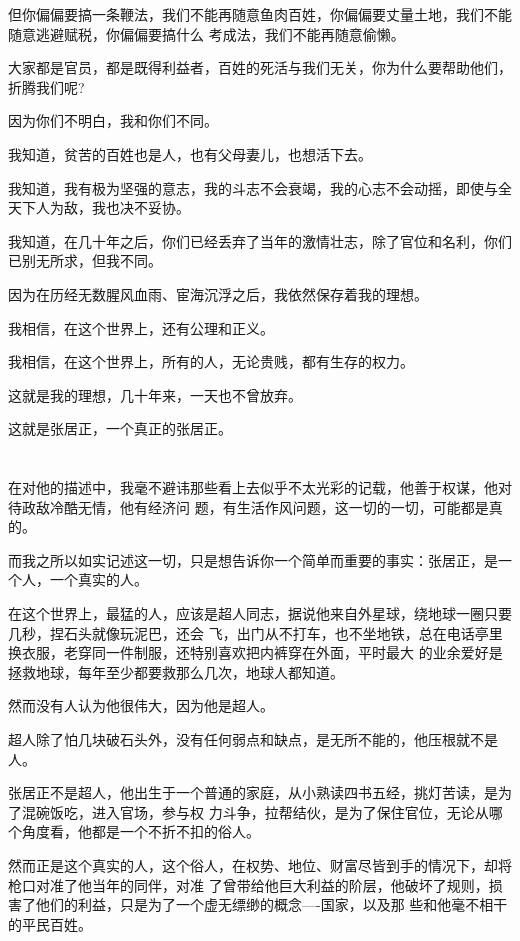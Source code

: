 \documentclass[11pt,a4paper,onecolumn]{article}
\begin{document}
但你偏偏要搞一条鞭法，我们不能再随意鱼肉百姓，你偏偏要丈量土地，我们不能随意逃避赋税，你偏偏要搞什么
考成法，我们不能再随意偷懒。

大家都是官员，都是既得利益者，百姓的死活与我们无关，你为什么要帮助他们，折腾我们呢?

因为你们不明白，我和你们不同。

我知道，贫苦的百姓也是人，也有父母妻儿，也想活下去。

我知道，我有极为坚强的意志，我的斗志不会衰竭，我的心志不会动摇，即使与全天下人为敌，我也决不妥协。

我知道，在几十年之后，你们已经丢弃了当年的激情壮志，除了官位和名利，你们已别无所求，但我不同。

因为在历经无数腥风血雨、宦海沉浮之后，我依然保存着我的理想。

我相信，在这个世界上，还有公理和正义。

我相信，在这个世界上，所有的人，无论贵贱，都有生存的权力。

这就是我的理想，几十年来，一天也不曾放弃。

这就是张居正，一个真正的张居正。

\section[\thesection]{}

在对他的描述中，我毫不避讳那些看上去似乎不太光彩的记载，他善于权谋，他对待政敌冷酷无情，他有经济问
题，有生活作风问题，这一切的一切，可能都是真的。

而我之所以如实记述这一切，只是想告诉你一个简单而重要的事实：张居正，是一个人，一个真实的人。

在这个世界上，最猛的人，应该是超人同志，据说他来自外星球，绕地球一圈只要几秒，捏石头就像玩泥巴，还会
飞，出门从不打车，也不坐地铁，总在电话亭里换衣服，老穿同一件制服，还特别喜欢把内裤穿在外面，平时最大
的业余爱好是拯救地球，每年至少都要救那么几次，地球人都知道。

然而没有人认为他很伟大，因为他是超人。

超人除了怕几块破石头外，没有任何弱点和缺点，是无所不能的，他压根就不是人。

张居正不是超人，他出生于一个普通的家庭，从小熟读四书五经，挑灯苦读，是为了混碗饭吃，进入官场，参与权
力斗争，拉帮结伙，是为了保住官位，无论从哪个角度看，他都是一个不折不扣的俗人。

然而正是这个真实的人，这个俗人，在权势、地位、财富尽皆到手的情况下，却将枪口对准了他当年的同伴，对准
了曾带给他巨大利益的阶层，他破坏了规则，损害了他们的利益，只是为了一个虚无缥缈的概念----国家，以及那
些和他毫不相干的平民百姓。
\end{document}
